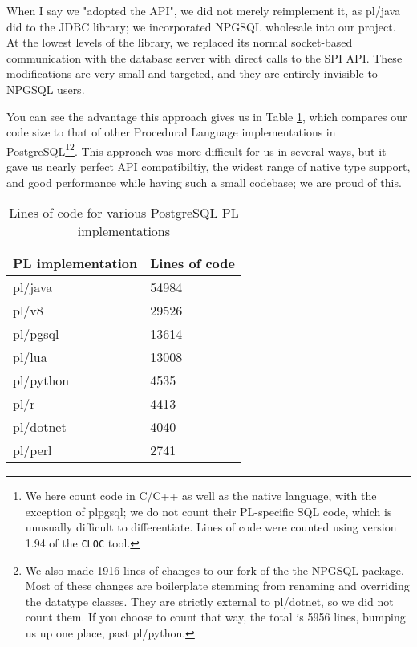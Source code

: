 \documentclass[sigconf,techreport,authorversion,nonacm]{acmart}
\begin{document}
When I say we "adopted the API", we did not merely reimplement it,
as pl/java did to the JDBC library; we incorporated NPGSQL wholesale
into our project.  At the lowest levels of the library, we replaced its
normal socket-based communication with the database server with direct
calls to the SPI API.  These modifications are very small and targeted,
and they are entirely invisible to NPGSQL users.

You can see the advantage this approach gives us in Table \ref{table:LOC},
which compares our code size to that of other Procedural Language
implementations in PostgreSQL\footnote{We here count code in C/C++
as well as the native language, with the exception of pl\/pgsql; we
do not count their PL-specific SQL code, which is unusually difficult
to differentiate.  Lines of code were counted using version 1.94 of the
\texttt{CLOC} tool.}\footnote{We also made 1916 lines of changes to our
fork of the the NPGSQL package.  Most of these changes are boilerplate
stemming from renaming and overriding the datatype classes.  They are
strictly external to pl/dotnet, so we did not count them.  If you choose
to count that way, the total is 5956 lines, bumping us up one place,
past pl/python.}.  This approach was more difficult for us in several
ways, but it gave us nearly perfect API compatibiltiy, the widest range
of native type support, and good performance while having such a small
codebase; we are proud of this.

\begin{table}[!htbp]
    \caption{Lines of code for various PostgreSQL PL implementations}
        \label{table:LOC}
        \begin{tabular}{l | l}
                \toprule
                \rowcolor{gray!25} \textbf{PL implementation} & \textbf{Lines of code} \\ \midrule
                pl/java                                       & 54984                  \\
                pl/v8                                         & 29526                  \\
                pl/pgsql                                      & 13614                  \\
                pl/lua                                        & 13008                  \\
                pl/python                                     & 4535                   \\
                pl/r                                          & 4413                   \\
                pl/dotnet                                     & 4040                   \\
                pl/perl                                       & 2741                   \\ \bottomrule
        \end{tabular}
\end{table}
\end{document}
